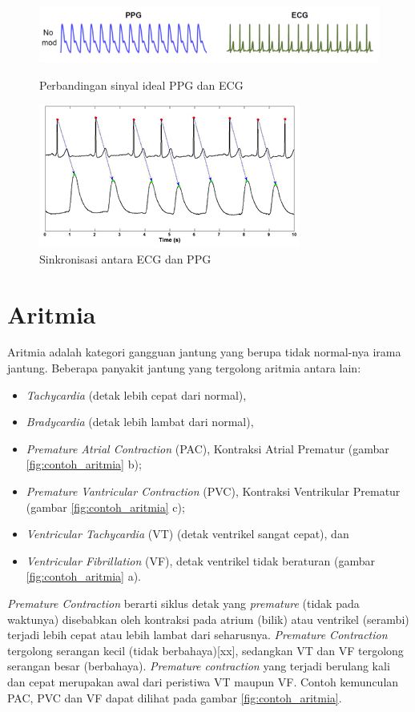 \begin{figure}[H]
    \centering
    \includegraphics[scale=0.6]{images/ecg_vs_ppg.png}
    \caption{Perbandingan sinyal ideal PPG dan ECG}
    \label{fig:ecg_vs_ppg}
	\includegraphics[scale=0.8]{images/sinkronisasi.jpg}
    \caption{Sinkronisasi antara ECG dan PPG}
    \label{fig:ecg_vs_ppg2}
\end{figure}

\section{Aritmia}
Aritmia adalah kategori gangguan jantung yang berupa tidak normal-nya irama jantung. Beberapa panyakit jantung yang tergolong aritmia antara lain:
\begin{itemize}
	\item \textit{Tachycardia} (detak lebih cepat dari normal),
	\item \textit{Bradycardia} (detak lebih lambat dari normal),
	\item \textit{Premature Atrial Contraction} (PAC), Kontraksi Atrial Prematur (gambar \ref{fig:contoh_aritmia} b);
	\item \textit{Premature Vantricular Contraction} (PVC), Kontraksi Ventrikular Prematur (gambar \ref{fig:contoh_aritmia} c);
	\item \textit{Ventricular Tachycardia} (VT) (detak ventrikel sangat cepat), dan
	\item \textit{Ventricular Fibrillation} (VF), detak ventrikel tidak beraturan (gambar \ref{fig:contoh_aritmia} a).
\end{itemize}

\textit{Premature Contraction} berarti siklus detak yang \textit{premature} (tidak pada waktunya) disebabkan oleh kontraksi pada atrium (bilik) atau ventrikel (serambi) terjadi lebih cepat atau lebih lambat dari seharusnya. \textit{Premature Contraction} tergolong serangan kecil (tidak berbahaya)[xx], sedangkan VT dan VF tergolong serangan besar (berbahaya). \textit{Premature contraction} yang terjadi berulang kali dan cepat merupakan awal dari peristiwa VT maupun VF. Contoh kemunculan PAC, PVC dan VF dapat dilihat pada gambar \ref{fig:contoh_aritmia}.

